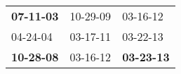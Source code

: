 \begin{supertabular}{p{0.33\columnwidth}p{0.33\columnwidth}p{0.33\columnwidth}}
 \textbf{07-11-03\textsuperscript{}} &  10-29-09\textsuperscript{} &           03-16-12\textsuperscript{} \\
          04-24-04\textsuperscript{} &  03-17-11\textsuperscript{} &           03-22-13\textsuperscript{} \\
 \textbf{10-28-08\textsuperscript{}} &  03-16-12\textsuperscript{} &  \textbf{03-23-13\textsuperscript{}} \\
\end{supertabular}
